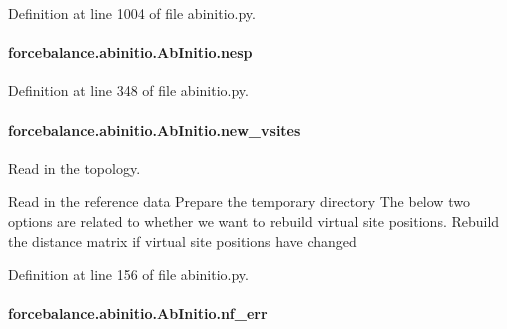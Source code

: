 Definition at line 1004 of file abinitio.\-py.

\hypertarget{classforcebalance_1_1abinitio_1_1AbInitio_ac258ad6180275ba2ffe5f68d1217e4ac}{
\paragraph[{nesp}]{\setlength{\rightskip}{0pt plus 5cm}forcebalance.\-abinitio.\-Ab\-Initio.\-nesp\hspace{0.3cm}{\ttfamily [inherited]}}}\label{classforcebalance_1_1abinitio_1_1AbInitio_ac258ad6180275ba2ffe5f68d1217e4ac}


Definition at line 348 of file abinitio.\-py.

\hypertarget{classforcebalance_1_1abinitio_1_1AbInitio_a64f1aeadac4d7b09424c20b83e5ad5af}{
\paragraph[{new\-\_\-vsites}]{\setlength{\rightskip}{0pt plus 5cm}forcebalance.\-abinitio.\-Ab\-Initio.\-new\-\_\-vsites\hspace{0.3cm}{\ttfamily [inherited]}}}\label{classforcebalance_1_1abinitio_1_1AbInitio_a64f1aeadac4d7b09424c20b83e5ad5af}


Read in the topology. 

Read in the reference data Prepare the temporary directory The below two options are related to whether we want to rebuild virtual site positions. Rebuild the distance matrix if virtual site positions have changed 

Definition at line 156 of file abinitio.\-py.

\hypertarget{classforcebalance_1_1abinitio_1_1AbInitio_a89de620e9aa500481c9e1ded99e14f72}{
\paragraph[{nf\-\_\-err}]{\setlength{\rightskip}{0pt plus 5cm}forcebalance.\-abinitio.\-Ab\-Initio.\-nf\-\_\-err\hspace{0.3cm}{\ttfamily [inherited]}}}\label{classforcebalance_1_1abinitio_1_1AbInitio_a89de620e9aa500481c9e1ded99e14f72}


